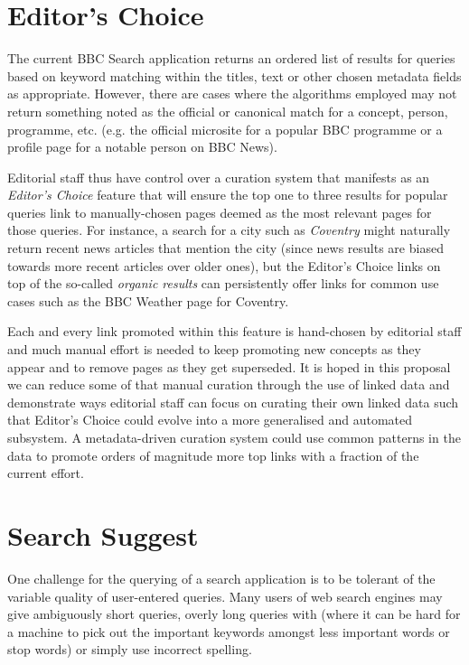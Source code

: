\documentclass[10pt,a4paper]{report}
\begin{document}
\section{Editor's Choice}

The current BBC Search application returns an ordered list of results
for queries based on keyword matching within the titles, text or other
chosen metadata fields as appropriate. However, there are cases where
the algorithms employed may not return something noted as the official
or canonical match for a concept, person, programme, etc. (e.g. the
official microsite for a popular BBC programme or a profile page for
a notable person on BBC News).

Editorial staff thus have control over a curation system that manifests
as an \emph{Editor's Choice} feature that will ensure the top one to three
results for popular queries link to manually-chosen pages deemed as the most
relevant pages for those queries. For instance, a search for a city such
as \emph{Coventry} might naturally return recent news articles that mention the
city (since news results are biased towards more recent articles over older
ones), but the Editor's Choice links on top of the so-called \emph{organic
results} can persistently offer links for common use cases such as
the BBC Weather page for Coventry.

Each and every link promoted within this feature is hand-chosen by editorial
staff and much manual effort is needed to keep promoting new concepts
as they appear and to remove pages as they get superseded. It is hoped
in this proposal we can reduce some of that manual curation through the use
of linked data and demonstrate ways editorial staff can focus on curating
their own linked data such that Editor's Choice could evolve into a more
generalised and automated subsystem. A metadata-driven curation system
could use common patterns in the data to promote orders of magnitude more
top links with a fraction of the current effort.

\section{Search Suggest}

One challenge for the querying of a search application is to be tolerant
of the variable quality of user-entered queries. Many users of web search
engines may give ambiguously short queries, overly long queries with (where
it can be hard for a machine to pick out the important keywords amongst
less important words or stop words\cite{rajaraman2011data})
or simply use incorrect spelling.
\end{document}

